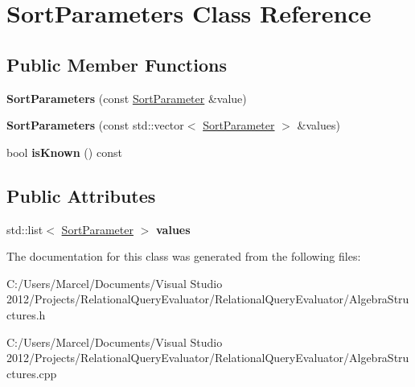 \hypertarget{class_sort_parameters}{\section{Sort\+Parameters Class Reference}
\label{class_sort_parameters}
}
\subsection*{Public Member Functions}
\begin{DoxyCompactItemize}
\item 
\hypertarget{class_sort_parameters_a3e09d106c13d4436e73109c8b0cfa60d}{{\bfseries Sort\+Parameters} (const \hyperlink{class_sort_parameter}{Sort\+Parameter} \&value)}\label{class_sort_parameters_a3e09d106c13d4436e73109c8b0cfa60d}

\item 
\hypertarget{class_sort_parameters_aa126d980ea7fd9ec7c088f3c642d788c}{{\bfseries Sort\+Parameters} (const std\+::vector$<$ \hyperlink{class_sort_parameter}{Sort\+Parameter} $>$ \&values)}\label{class_sort_parameters_aa126d980ea7fd9ec7c088f3c642d788c}

\item 
\hypertarget{class_sort_parameters_aa29d3a50f026c0d840c16af26f8d7b07}{bool {\bfseries is\+Known} () const }\label{class_sort_parameters_aa29d3a50f026c0d840c16af26f8d7b07}

\end{DoxyCompactItemize}
\subsection*{Public Attributes}
\begin{DoxyCompactItemize}
\item 
\hypertarget{class_sort_parameters_ad40f9ae2cd97faa92c29f2fc1c3941d0}{std\+::list$<$ \hyperlink{class_sort_parameter}{Sort\+Parameter} $>$ {\bfseries values}}\label{class_sort_parameters_ad40f9ae2cd97faa92c29f2fc1c3941d0}

\end{DoxyCompactItemize}


The documentation for this class was generated from the following files\+:\begin{DoxyCompactItemize}
\item 
C\+:/\+Users/\+Marcel/\+Documents/\+Visual Studio 2012/\+Projects/\+Relational\+Query\+Evaluator/\+Relational\+Query\+Evaluator/Algebra\+Structures.\+h\item 
C\+:/\+Users/\+Marcel/\+Documents/\+Visual Studio 2012/\+Projects/\+Relational\+Query\+Evaluator/\+Relational\+Query\+Evaluator/Algebra\+Structures.\+cpp\end{DoxyCompactItemize}

